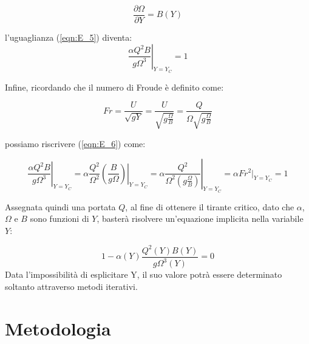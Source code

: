 \documentclass[12pt]{article} %
\begin{document}
\begin{equation}
    \frac{\partial \Omega}{\partial Y}=B(Y)
    \label{eqn:B}
\end{equation}

\noindent l’uguaglianza (\ref{eqn:E_5}) diventa:
\begin{equation}
    \left.\frac{\alpha Q^{2}B}{g\Omega^{3}}\right|_{Y=Y_{C}}=1
    \label{eqn:E_6}
\end{equation}

\noindent Infine, ricordando che il numero di Froude è definito come:

\begin{equation}
    Fr=\frac{U}{\sqrt{gY}}=\frac{U}{\sqrt{g\frac{\Omega}{B}}}=\frac{Q}{\Omega \sqrt{g\frac{\Omega}{B}}}
    \label{eqn:Froude}
\end{equation}

\noindent possiamo riscrivere (\ref{eqn:E_6}) come:

\begin{equation}
    \left.\frac{\alpha Q^{2}B}{g\Omega^{3}}\right|_{Y=Y_C}=\alpha \frac {Q^{2}}{\Omega^{2}}\left.\left(\frac{B}{g\Omega}\right)\right|_{Y=Y_C}=\alpha\left.\frac {Q^{2}}{\Omega^{2}\left(g\frac{\Omega}{B}\right)}\right|_{Y=Y_{C}}=\alpha Fr^{2}|_{Y=Y_C}=1
    \label{eqn:E_7}
\end{equation}

\noindent Assegnata quindi una portata $Q$, al fine di ottenere il tirante critico, dato che $\alpha$, $\Omega$ e $B$ sono funzioni di $Y$, basterà risolvere un’equazione implicita nella variabile $Y$:

\begin{equation}
    1-\alpha(Y)\frac{Q^{2}(Y)B(Y)}{g\Omega^{3}(Y)}=0
    \label{eqn:E_8}
\end{equation}
\noindent Data l'impossibilità di esplicitare Y, il suo valore potrà essere determinato soltanto attraverso metodi iterativi.

\newpage
\section{Metodologia}
\end{document}
